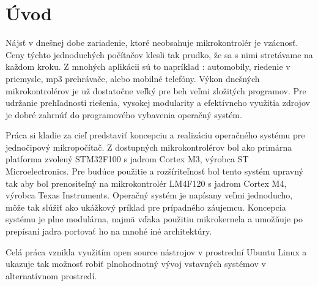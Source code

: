 \chapter*{Úvod}

Nájsť v dnešnej dobe zariadenie, ktoré neobsahuje mikrokontrolér je vzácnosť. Ceny týchto jednoduchých
počítačov klesli tak prudko, že sa s nimi stretávame na každom kroku. Z mnohých aplikácii sú to napríklad : automobily, riedenie v priemysle, mp3 prehrávače, alebo mobilné telefóny. Výkon dnešných
mikrokontrolérov je už dostatočne veľký pre beh veľmi zložitých programov. Pre udržanie prehľadnosti riešenia, vysokej modularity a efektívneho využitia zdrojov je dobré zahrnúť do programového vybavenia operačný systém. 

Práca si kladie za cieľ predstaviť koncepciu a realizáciu operačného systému pre jednočipový mikropočítač. Z dostupných mikrokontrolérov bol ako primárna platforma zvolený STM32F100 s jadrom Cortex M3, výrobca ST Microelectronics. Pre budúce použitie a rozšíriteľnosť bol tento systém upravný tak aby bol prenositeľný na mikrokontrolér LM4F120 s jadrom Cortex M4, výrobca Texas Instruments. Operačný systém je napísany veľmi jednoducho, môže tak slúžiť ako ukážkový príklad pre prípadného záujemcu. Koncepcia systému je plne modulárna, najmä vďaka použitiu mikrokernela a umožňuje po prepísaní jadra portovať ho na mnohé iné architektúry. 

Celá práca vznikla využitím open source nástrojov v prostrední Ubuntu Linux a ukazuje tak možnosť robiť plnohodnotný vývoj vstavných systémov v alternatívnom prostredí.
